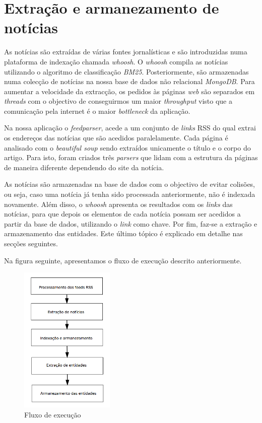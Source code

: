 \section{Extração e armanezamento de notícias}
As notícias são extraídas de várias fontes jornalísticas e são introduzidas numa plataforma de indexação chamada \textit{whoosh}. O \textit{whoosh} compila as notícias utilizando o algoritmo de classificação \textit{BM25}. Posteriormente, são armazenadas numa colecção de notícias na nossa base de dados não relacional \textit{MongoDB}. Para aumentar a velocidade da extracção, os pedidos às páginas \textit{web} são separados em \textit{threads} com o objectivo de conseguirmos um maior \textit{throughput} visto que a comunicação pela internet é o maior \textit{bottleneck} da aplicação.

Na nossa aplicação o \textit{feedparser}, acede a um conjunto de \textit{links} RSS do qual extrai os endereços das notícias que são acedidos paralelamente. Cada página é analisado com o \textit{beautiful soup} sendo extraídos unicamente o título e o corpo do artigo. Para isto, foram criados três \textit{parsers} que lidam com a estrutura da páginas de maneira diferente dependendo do site da notícia.

As notícias são armazenadas na base de dados com o objectivo de evitar colisões, ou seja, caso uma notícia já tenha sido processada anteriormente, não é indexada novamente. Além disso, o \textit{whoosh} apresenta os resultados com os \textit{links} das notícias, para que depois os elementos de cada notícia possam ser acedidos a partir da base de dados, utilizando o \textit{link} como chave. Por fim, faz-se a extração e armazenamento das entidades. Este último tópico é explicado em detalhe nas secções seguintes.

Na figura seguinte, apresentamos o fluxo de execução descrito anteriormente.

\begin{figure}[htbp]
  \centering
    \includegraphics[width=0.4\textwidth]{images/fluxo.png}
    \caption{Fluxo de execução}
\end{figure}

